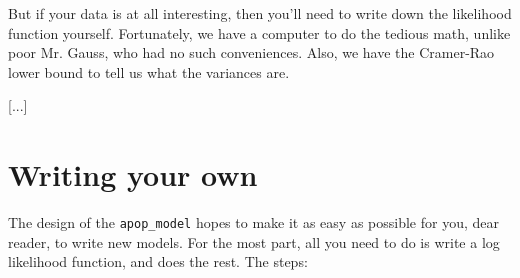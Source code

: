 But if your data is at all interesting, then you'll need to write down
the likelihood function yourself.  Fortunately, we have a computer to
do the tedious math, unlike poor Mr. Gauss, who had no such conveniences.
Also, we have the Cramer-Rao lower bound to tell us what the variances
are. 

[...]


\section{Writing your own}
The design of the {\tt apop\_\-model} hopes to make it as easy as possible for you,
dear reader, to write new models. For the most part, all you need to
do is write a log likelihood function, and 
does the rest. The steps:


